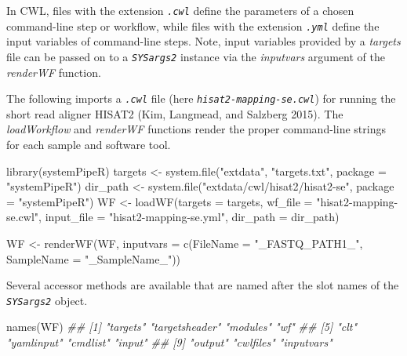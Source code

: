 \documentclass[14pt,]{article}
\newcommand{\hlstr}[1]{\textcolor[rgb]{0.251,0.627,0.251}{#1}}%
\newcommand{\hlcom}[1]{\textcolor[rgb]{0.502,0.502,0.502}{\textit{#1}}}%
\newcommand{\hlstd}[1]{\textcolor[rgb]{0.251,0.251,0.251}{#1}}%
\newcommand{\hlkwc}[1]{\textcolor[rgb]{0.251,0.251,0.251}{#1}}%
\newcommand{\hlkwd}[1]{\textcolor[rgb]{0.878,0.439,0.125}{#1}}%
\newenvironment{Shaded}{\begin{myshaded}}{\end{myshaded}}
\newcommand{\KeywordTok}[1]{\hlkwd{#1}}
\newcommand{\DataTypeTok}[1]{\hlkwc{#1}}
\newcommand{\StringTok}[1]{\hlstr{#1}}
\newcommand{\CommentTok}[1]{\hlcom{#1}}
\newcommand{\NormalTok}[1]{\hlstd{#1}}
\begin{document}
In CWL, files with the extension \emph{\texttt{.cwl}} define the parameters of a chosen
command-line step or workflow, while files with the extension \emph{\texttt{.yml}} define
the input variables of command-line steps. Note, input variables provided
by a \emph{targets} file can be passed on to a \emph{\texttt{SYSargs2}} instance via the \emph{inputvars}
argument of the \emph{renderWF} function.

The following imports a \emph{\texttt{.cwl}} file (here \emph{\texttt{hisat2-mapping-se.cwl}}) for running
the short read aligner HISAT2 (Kim, Langmead, and Salzberg 2015). The \emph{loadWorkflow} and \emph{renderWF}
functions render the proper command-line strings for each sample and software tool.

\begin{Shaded}
\begin{Highlighting}[]
\KeywordTok{library}\NormalTok{(systemPipeR)}
\NormalTok{targets <-}\StringTok{ }\KeywordTok{system.file}\NormalTok{(}\StringTok{"extdata"}\NormalTok{, }\StringTok{"targets.txt"}\NormalTok{, }\DataTypeTok{package =} \StringTok{"systemPipeR"}\NormalTok{)}
\NormalTok{dir_path <-}\StringTok{ }\KeywordTok{system.file}\NormalTok{(}\StringTok{"extdata/cwl/hisat2/hisat2-se"}\NormalTok{, }\DataTypeTok{package =} \StringTok{"systemPipeR"}\NormalTok{)}
\NormalTok{WF <-}\StringTok{ }\KeywordTok{loadWF}\NormalTok{(}\DataTypeTok{targets =}\NormalTok{ targets, }\DataTypeTok{wf_file =} \StringTok{"hisat2-mapping-se.cwl"}\NormalTok{, }\DataTypeTok{input_file =} \StringTok{"hisat2-mapping-se.yml"}\NormalTok{, }
    \DataTypeTok{dir_path =}\NormalTok{ dir_path)}

\NormalTok{WF <-}\StringTok{ }\KeywordTok{renderWF}\NormalTok{(WF, }\DataTypeTok{inputvars =} \KeywordTok{c}\NormalTok{(}\DataTypeTok{FileName =} \StringTok{"_FASTQ_PATH1_"}\NormalTok{, }\DataTypeTok{SampleName =} \StringTok{"_SampleName_"}\NormalTok{))}
\end{Highlighting}
\end{Shaded}

Several accessor methods are available that are named after the slot names of the \emph{\texttt{SYSargs2}} object.

\begin{Shaded}
\begin{Highlighting}[]
\KeywordTok{names}\NormalTok{(WF)}
\CommentTok{##  [1] "targets"       "targetsheader" "modules"       "wf"           }
\CommentTok{##  [5] "clt"           "yamlinput"     "cmdlist"       "input"        }
\CommentTok{##  [9] "output"        "cwlfiles"      "inputvars"}
\end{Highlighting}
\end{Shaded}
\end{document}
